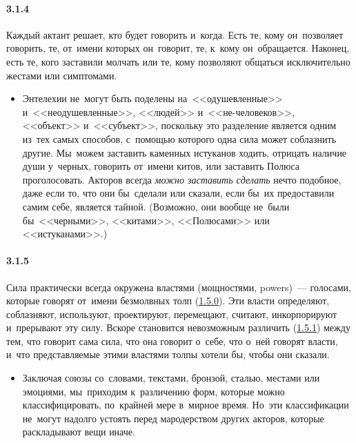 \paragraph{3.1.4}\hypertarget{par:3.1.4}{} Каждый актант решает, кто будет говорить и~когда. Есть те, кому он~позволяет говорить, те, от~имени которых он~говорит, те, к~кому он~обращается. Наконец, есть те, кого заставили молчать или те, кому позволяют общаться исключительно жестами или
симптомами. 
	\begin{itemize}
	\item 
	Энтелехии не~могут быть поделены на~<<одушевленные>> и~<<неодушевленные>>, <<людей>> и~<<не-человеков>>, <<объект>> и~<<субъект>>, поскольку это разделение является одним из~тех самых способов, с~помощью которого одна сила может соблазнить другие. Мы~можем заставить каменных истуканов ходить, отрицать наличие души у~черных, говорить от~имени китов, или заставить Полюса проголосовать. Акторов всегда {\itshape можно заставить сделать} нечто подобное, даже если то, что они бы~сделали или сказали, если бы~их предоставили самим себе, является тайной. (Возможно, они вообще не~были бы~<<черными>>, <<китами>>, <<Полюсами>> или <<истуканами>>.)
	\end{itemize}

\paragraph{3.1.5}\hypertarget{par:3.1.5}{} Сила практически всегда окружена властями (мощностями, powers)~--- голосами, которые говорят от~имени безмолвных толп (\hyperlink{par:1.5.0}{1.5.0}). Эти власти определяют, соблазняют,
используют, проектируют, перемещают, считают, инкорпорируют и~прерывают эту силу. Вскоре становится невозможным различить (\hyperlink{par:1.5.1}{1.5.1}) между тем, что говорит сама сила, что она говорит о~себе, что о~ней говорят власти, и~что представляемые этими властями толпы хотели бы, чтобы они сказали. 
	\begin{itemize}
	\item 
	Заключая союзы со~словами, текстами, бронзой, сталью, местами или эмоциями, мы~приходим к~различению форм, которые можно классифицировать, по~крайней мере в~мирное время. Но~эти классификации не~могут надолго устоять перед мародерством других акторов, которые раскладывают вещи иначе.
	\end{itemize}

